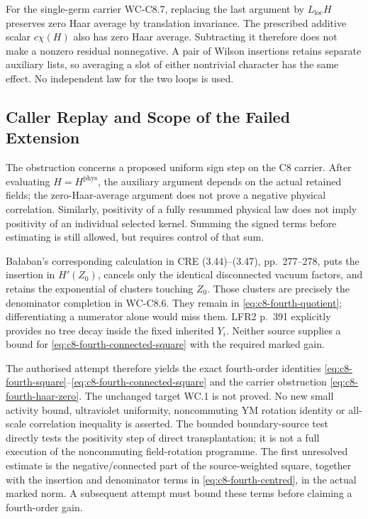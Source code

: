\documentclass[11pt]{article}
\begin{document}
For the single-germ carrier WC-C8.7, replacing the last argument by
$L_{\mathrm{loc}}H$ preserves zero Haar average by translation
invariance. The prescribed additive scalar $c\chi(H)$ also has zero
Haar average. Subtracting it therefore does not make a nonzero residual
nonnegative. A pair of Wilson insertions retains separate auxiliary
lists, so averaging a slot of either nontrivial character has the same
effect. No independent law for the two loops is used.

\subsection{Caller Replay and Scope of the Failed Extension}

The obstruction concerns a proposed uniform sign step on the C8
carrier. After evaluating $H=H^{\mathrm{phys}}$, the auxiliary argument
depends on the actual retained fields; the zero-Haar-average argument
does not prove a negative physical correlation. Similarly, positivity
of a fully resummed physical law does not imply positivity of an
individual selected kernel. Summing the signed terms before estimating
is still allowed, but requires control of that sum.

Ba{\l}aban's corresponding calculation in CRE (3.44)--(3.47),
pp.~277--278, puts the insertion in $H'(Z_0)$, cancels only the
identical disconnected vacuum factors, and retains the exponential
of clusters touching $Z_0$. Those clusters are precisely the
denominator completion in WC-C8.6. They remain in
\eqref{eq:c8-fourth-quotient}; differentiating a numerator alone would
miss them. LFR2 p.~391 explicitly provides no tree decay inside the
fixed inherited $Y_i$. Neither source supplies a bound for
\eqref{eq:c8-fourth-connected-square} with the required marked gain.

The authorised attempt therefore yields the exact fourth-order
identities \eqref{eq:c8-fourth-square}--\eqref{eq:c8-fourth-connected-square}
and the carrier obstruction \eqref{eq:c8-fourth-haar-zero}.
The unchanged target WC.1 is not proved. No new small activity bound,
ultraviolet uniformity, noncommuting YM rotation identity or all-scale
correlation inequality is asserted. The bounded boundary-source test
directly tests the positivity step of direct transplantation; it is not a full execution
of the noncommuting field-rotation programme. The first unresolved
estimate is the negative/connected part of the source-weighted square,
together with the insertion and denominator terms in
\eqref{eq:c8-fourth-centred}, in the actual marked norm. A subsequent
attempt must bound these terms before claiming a fourth-order gain.
\end{document}
